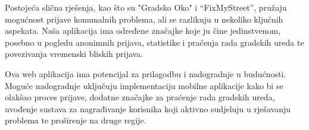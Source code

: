 \noindent Postojeća slična rješenja, kao što su "Gradsko Oko" i “FixMyStreet”, pružaju mogućnost prijave komunalnih problema, ali se razlikuju u nekoliko ključnih aspekata. Naša aplikacija ima određene značajke koje ju čine jedinstvenom, posebno u pogledu anonimnih prijava, statistike i praćenja rada gradskih ureda te povezivanja vremenski bliskih prijava.


\noindent Ova web aplikacija ima potencijal za prilagodbu i nadogradnje u budućnosti. Moguće nadogradnje uključuju implementaciju mobilne aplikacije kako bi se olakšao proces prijave, dodatne značajke za praćenje rada gradskih ureda, uvođenje sustava za nagrađivanje korisnika koji aktivno sudjeluju u rješavanju problema te proširenje na druge regije.

\eject






